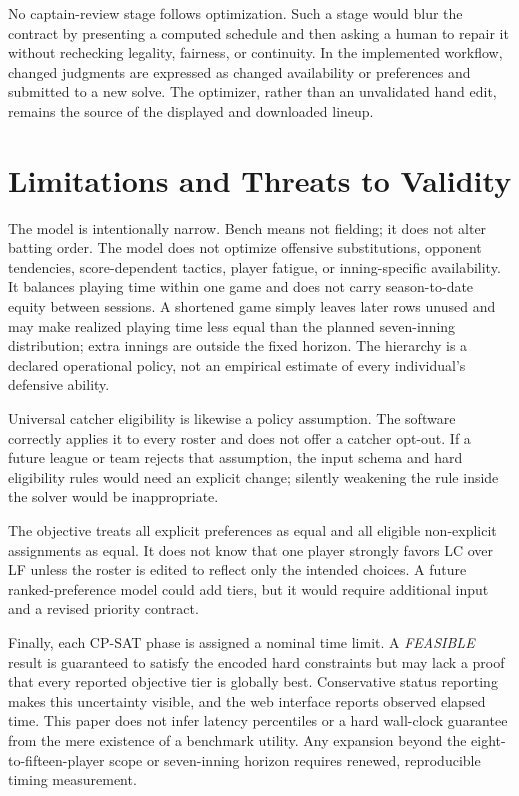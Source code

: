 \documentclass[11pt]{article}
\begin{document}
No captain-review stage follows optimization. Such a stage would blur the
contract by presenting a computed schedule and then asking a human to repair
it without rechecking legality, fairness, or continuity. In the implemented
workflow, changed judgments are expressed as changed availability or
preferences and submitted to a new solve. The optimizer, rather than an
unvalidated hand edit, remains the source of the displayed and downloaded
lineup.

\section{Limitations and Threats to Validity}

The model is intentionally narrow. Bench means not fielding; it does not alter
batting order. The model does not optimize offensive substitutions, opponent
tendencies, score-dependent tactics, player fatigue, or inning-specific
availability. It balances playing time within one game and does not carry
season-to-date equity between sessions. A shortened game simply leaves later
rows unused and may make realized playing time less equal than the planned
seven-inning distribution; extra innings are outside the fixed horizon. The
hierarchy is a declared operational policy, not an empirical estimate of every
individual's defensive ability.

Universal catcher eligibility is likewise a policy assumption. The software
correctly applies it to every roster and does not offer a catcher opt-out.
If a future league or team rejects that assumption, the input schema and hard
eligibility rules would need an explicit change; silently weakening the rule
inside the solver would be inappropriate.

The objective treats all explicit preferences as equal and all eligible
non-explicit assignments as equal. It does not know that one player strongly
favors LC over LF unless the roster is edited to reflect only the intended
choices. A future
ranked-preference model could add tiers, but it would require additional input
and a revised priority contract.

Finally, each CP-SAT phase is assigned a nominal time limit. A
\emph{FEASIBLE} result is guaranteed to satisfy the encoded hard constraints
but may lack a proof that every reported objective tier is globally best.
Conservative status reporting makes this uncertainty visible, and the web
interface reports observed elapsed time. This paper does not infer latency
percentiles or a hard wall-clock guarantee from the mere existence of a
benchmark utility. Any expansion beyond the eight-to-fifteen-player scope or
seven-inning horizon requires renewed, reproducible timing measurement.
\end{document}
